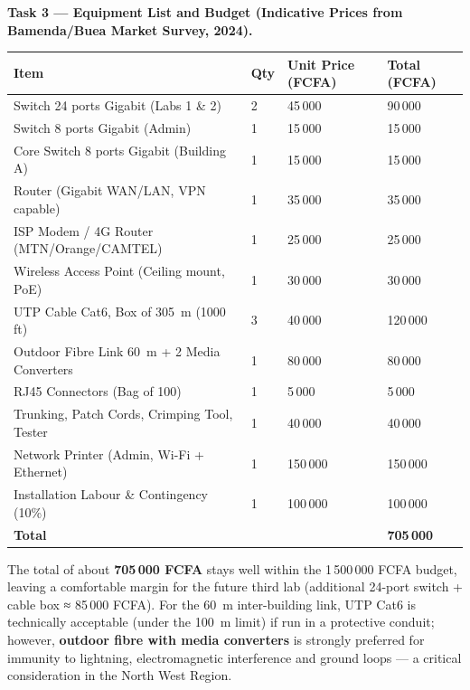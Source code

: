 \documentclass[11pt]{article}
\begin{document}
\textbf{Task 3 — Equipment List and Budget (Indicative Prices from Bamenda/Buea Market Survey, 2024).}\par

\begin{center}
\begin{tabularx}{\linewidth}{|X|l|l|l|}\hline
\rowcolor{popblueL} \textbf{Item} & \textbf{Qty} & \textbf{Unit Price (FCFA)} & \textbf{Total (FCFA)} \\ \hline
Switch 24 ports Gigabit (Labs 1 \& 2) & 2 & 45\,000 & 90\,000 \\ \hline
Switch 8 ports Gigabit (Admin) & 1 & 15\,000 & 15\,000 \\ \hline
Core Switch 8 ports Gigabit (Building A) & 1 & 15\,000 & 15\,000 \\ \hline
Router (Gigabit WAN/LAN, VPN capable) & 1 & 35\,000 & 35\,000 \\ \hline
ISP Modem / 4G Router (MTN/Orange/CAMTEL) & 1 & 25\,000 & 25\,000 \\ \hline
Wireless Access Point (Ceiling mount, PoE) & 1 & 30\,000 & 30\,000 \\ \hline
UTP Cable Cat6, Box of \SI{305}{m} (1000 ft) & 3 & 40\,000 & 120\,000 \\ \hline
Outdoor Fibre Link \SI{60}{m} + 2 Media Converters & 1 & 80\,000 & 80\,000 \\ \hline
RJ45 Connectors (Bag of 100) & 1 & 5\,000 & 5\,000 \\ \hline
Trunking, Patch Cords, Crimping Tool, Tester & 1 & 40\,000 & 40\,000 \\ \hline
Network Printer (Admin, Wi-Fi + Ethernet) & 1 & 150\,000 & 150\,000 \\ \hline
Installation Labour \& Contingency (10\%) & 1 & 100\,000 & 100\,000 \\ \hline
\rowcolor{popgreenL} \textbf{Total} & & & \textbf{705\,000} \\ \hline
\end{tabularx}
\end{center}

The total of about \textbf{705\,000 FCFA} stays well within the 1\,500\,000 FCFA budget, leaving a comfortable margin for the future third lab (additional 24-port switch + cable box ≈ 85\,000 FCFA). For the \SI{60}{m} inter-building link, UTP Cat6 is technically acceptable (under the \SI{100}{m} limit) if run in a protective conduit; however, \textbf{outdoor fibre with media converters} is strongly preferred for immunity to lightning, electromagnetic interference and ground loops — a critical consideration in the North West Region.
\end{document}
